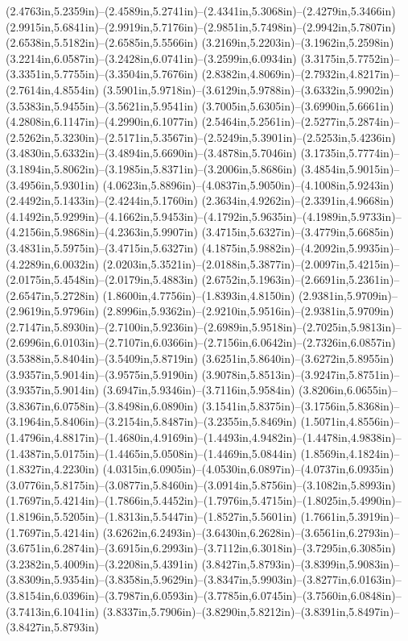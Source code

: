 (2.4763in,5.2359in)--(2.4589in,5.2741in)--(2.4341in,5.3068in)--(2.4279in,5.3466in) (2.9915in,5.6841in)--(2.9919in,5.7176in)--(2.9851in,5.7498in)--(2.9942in,5.7807in) (2.6538in,5.5182in)--(2.6585in,5.5566in) (3.2169in,5.2203in)--(3.1962in,5.2598in) (3.2214in,6.0587in)--(3.2428in,6.0741in)--(3.2599in,6.0934in) (3.3175in,5.7752in)--(3.3351in,5.7755in)--(3.3504in,5.7676in) (2.8382in,4.8069in)--(2.7932in,4.8217in)--(2.7614in,4.8554in) (3.5901in,5.9718in)--(3.6129in,5.9788in)--(3.6332in,5.9902in) (3.5383in,5.9455in)--(3.5621in,5.9541in) (3.7005in,5.6305in)--(3.6990in,5.6661in) (4.2808in,6.1147in)--(4.2990in,6.1077in) (2.5464in,5.2561in)--(2.5277in,5.2874in)--(2.5262in,5.3230in)--(2.5171in,5.3567in)--(2.5249in,5.3901in)--(2.5253in,5.4236in) (3.4830in,5.6332in)--(3.4894in,5.6690in)--(3.4878in,5.7046in) (3.1735in,5.7774in)--(3.1894in,5.8062in)--(3.1985in,5.8371in)--(3.2006in,5.8686in) (3.4854in,5.9015in)--(3.4956in,5.9301in) (4.0623in,5.8896in)--(4.0837in,5.9050in)--(4.1008in,5.9243in) (2.4492in,5.1433in)--(2.4244in,5.1760in) (2.3634in,4.9262in)--(2.3391in,4.9668in) (4.1492in,5.9299in)--(4.1662in,5.9453in)--(4.1792in,5.9635in)--(4.1989in,5.9733in)--(4.2156in,5.9868in)--(4.2363in,5.9907in) (3.4715in,5.6327in)--(3.4779in,5.6685in) (3.4831in,5.5975in)--(3.4715in,5.6327in) (4.1875in,5.9882in)--(4.2092in,5.9935in)--(4.2289in,6.0032in) (2.0203in,5.3521in)--(2.0188in,5.3877in)--(2.0097in,5.4215in)--(2.0175in,5.4548in)--(2.0179in,5.4883in) (2.6752in,5.1963in)--(2.6691in,5.2361in)--(2.6547in,5.2728in) (1.8600in,4.7756in)--(1.8393in,4.8150in) (2.9381in,5.9709in)--(2.9619in,5.9796in) (2.8996in,5.9362in)--(2.9210in,5.9516in)--(2.9381in,5.9709in) (2.7147in,5.8930in)--(2.7100in,5.9236in)--(2.6989in,5.9518in)--(2.7025in,5.9813in)--(2.6996in,6.0103in)--(2.7107in,6.0366in)--(2.7156in,6.0642in)--(2.7326in,6.0857in) (3.5388in,5.8404in)--(3.5409in,5.8719in) (3.6251in,5.8640in)--(3.6272in,5.8955in) (3.9357in,5.9014in)--(3.9575in,5.9190in) (3.9078in,5.8513in)--(3.9247in,5.8751in)--(3.9357in,5.9014in) (3.6947in,5.9346in)--(3.7116in,5.9584in) (3.8206in,6.0655in)--(3.8367in,6.0758in)--(3.8498in,6.0890in) (3.1541in,5.8375in)--(3.1756in,5.8368in)--(3.1964in,5.8406in)--(3.2154in,5.8487in)--(3.2355in,5.8469in) (1.5071in,4.8556in)--(1.4796in,4.8817in)--(1.4680in,4.9169in)--(1.4493in,4.9482in)--(1.4478in,4.9838in)--(1.4387in,5.0175in)--(1.4465in,5.0508in)--(1.4469in,5.0844in) (1.8569in,4.1824in)--(1.8327in,4.2230in) (4.0315in,6.0905in)--(4.0530in,6.0897in)--(4.0737in,6.0935in) (3.0776in,5.8175in)--(3.0877in,5.8460in)--(3.0914in,5.8756in)--(3.1082in,5.8993in) (1.7697in,5.4214in)--(1.7866in,5.4452in)--(1.7976in,5.4715in)--(1.8025in,5.4990in)--(1.8196in,5.5205in)--(1.8313in,5.5447in)--(1.8527in,5.5601in) (1.7661in,5.3919in)--(1.7697in,5.4214in) (3.6262in,6.2493in)--(3.6430in,6.2628in)--(3.6561in,6.2793in)--(3.6751in,6.2874in)--(3.6915in,6.2993in)--(3.7112in,6.3018in)--(3.7295in,6.3085in) (3.2382in,5.4009in)--(3.2208in,5.4391in) (3.8427in,5.8793in)--(3.8399in,5.9083in)--(3.8309in,5.9354in)--(3.8358in,5.9629in)--(3.8347in,5.9903in)--(3.8277in,6.0163in)--(3.8154in,6.0396in)--(3.7987in,6.0593in)--(3.7785in,6.0745in)--(3.7560in,6.0848in)--(3.7413in,6.1041in) (3.8337in,5.7906in)--(3.8290in,5.8212in)--(3.8391in,5.8497in)--(3.8427in,5.8793in) 